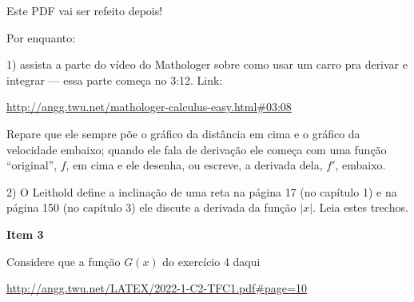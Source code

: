 \documentclass[oneside,12pt]{article}
\begin{document}
\newpage

Este PDF vai ser refeito depois!

Por enquanto:

\msk

%                                           

1) assista a parte do vídeo do Mathologer sobre como usar um carro pra
derivar e integrar --- essa parte começa no 3:12. Link:

\ssk

{\footnotesize

\url{http://angg.twu.net/mathologer-calculus-easy.html\#03:08}

}

\ssk

Repare que ele sempre põe o gráfico da distância em cima e o gráfico
da velocidade embaixo; quando ele fala de derivação ele começa com uma
função ``original'', $f$, em cima e ele desenha, ou escreve, a
derivada dela, $f'$, embaixo.

\msk


2) O Leithold define a inclinação de uma reta na página 17 (no
capítulo 1) e na página 150 (no capítulo 3) ele discute a derivada da
função $|x|$. Leia estes trechos.


\newpage

%                                

{\bf Item 3}

\ssk

Considere que a função $G(x)$ do exercício 4 daqui

\ssk

{\footnotesize

\url{http://angg.twu.net/LATEX/2022-1-C2-TFC1.pdf#page=10}

}
\end{document}
